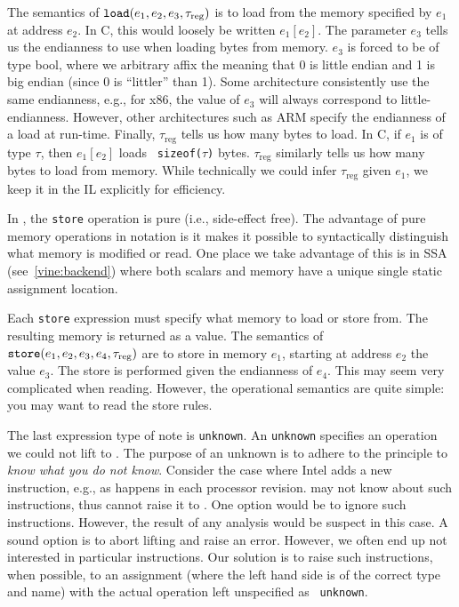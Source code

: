 The semantics of ${\tt load}(e_1, e_2, e_3, \tau_{\text{reg}})$ is to
load from the memory specified by $e_1$ at address $e_2$. In C, this
would loosely be written $e_1[e_2]$.  The parameter $e_3$ tells us the
endianness to use when loading bytes from memory. $e_3$ is forced to
be of type bool, where we arbitrary affix the meaning that 0 is little
endian and 1 is big endian (since 0 is ``littler'' than 1). Some
architecture consistently use the same endianness, e.g., for x86, the
value of $e_3$ will always correspond to little-endianness.  However,
other architectures such as ARM specify the endianness of a load at
run-time.  Finally, $\tau_{\text{reg}}$ tells us how many bytes to
load.  In C, if $e_1$ is of type $\tau$, then $e_1[e_2]$ loads {\tt
  sizeof($\tau$)} bytes.  $\tau_{\text{reg}}$ similarly tells us how
many bytes to load from memory. While technically we could infer
$\tau_{\text{reg}}$ given $e_1$, we keep it in the IL explicitly for
efficiency.


In \bil, the {\tt store} operation is pure (i.e., side-effect
free). The advantage of pure memory operations in \bil notation is it
makes it possible to syntactically distinguish what memory is modified
or read.  One place we take advantage of this is in SSA
(see~\ref{vine:backend}) where both scalars and memory have a unique
single static assignment location.

Each {\tt store} expression must specify what memory to load or store
from.  The resulting memory is returned as a value.  The semantics of
${\tt store}(e_1, e_2, e_3, e_4, \tau_{\text{reg}})$ are to store in
memory $e_1$, starting at address $e_2$ the value $e_3$.  The store is
performed given the endianness of $e_4$.  This may seem very
complicated when reading. However, the operational semantics are quite
simple: you may want to read the  {\sc store} rules.


The last expression type of note is {\tt unknown}.  An {\tt unknown}
specifies an operation we could not lift to \bil.  The purpose of an
unknown is to adhere to the \bap principle to \emph{know what you do
  not know}.  Consider the case where Intel adds a new instruction,
e.g., as happens in each processor revision.  \bap may not know about
such instructions, thus cannot raise it to \bil. One option would be
to ignore such instructions. However, the result of any analysis would
be suspect in this case. A sound option is to abort lifting and raise
an error. However, we often end up not interested in particular
instructions. Our solution is to raise such instructions, when
possible, to an assignment (where the left hand side is of the correct
type and name) with the actual operation left unspecified as {\tt
  unknown}.

